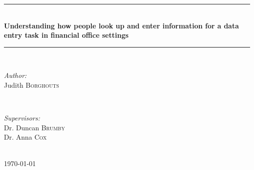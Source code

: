 \begin{titlepage}

\newcommand{\HRule}{\rule{\linewidth}{0.5mm}} %

\center %



\HRule \\[0.4cm]
{\Large \bfseries Understanding how people look up and enter information for a data entry task in financial office settings
}\\[0.4cm] %
\HRule \\[1.5cm]
 

\begin{minipage}{0.4\textwidth}
\begin{flushleft} \large
\emph{Author:}\\
Judith \textsc{Borghouts} %
\end{flushleft}
\end{minipage}
~
\begin{minipage}{0.4\textwidth}
\begin{flushright} \large
\emph{Supervisors:} \\
Dr. Duncan \textsc{Brumby} \\%
Dr. Anna \textsc{Cox}
\end{flushright}
\end{minipage}\\[4cm]



{\large \today}\\[3cm] %


\end{titlepage}
